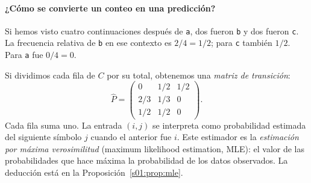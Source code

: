 \paragraph{¿Cómo se convierte un conteo en una predicción?}
Si hemos visto cuatro continuaciones después de \texttt{a}, dos fueron \texttt{b} y dos fueron \texttt{c}. La frecuencia relativa de \texttt{b} en ese contexto es $2/4=1/2$; para \texttt{c} también $1/2$. Para \texttt{a} fue $0/4=0$.
\begin{center}
\end{center}
Si dividimos cada fila de $C$ por su total, obtenemos una \emph{matriz de transición}:
\[
\widehat P=\begin{pmatrix}0&1/2&1/2\\2/3&1/3&0\\1/2&1/2&0\end{pmatrix}.
\]
Cada fila suma uno. La entrada $(i,j)$ se interpreta como probabilidad estimada del siguiente símbolo $j$ cuando el anterior fue $i$. Este estimador es la \emph{estimación por máxima verosimilitud} (maximum likelihood estimation, MLE): el valor de las probabilidades que hace máxima la probabilidad de los datos observados. La deducción está en la Proposición~\ref{s01:prop:mle}.

